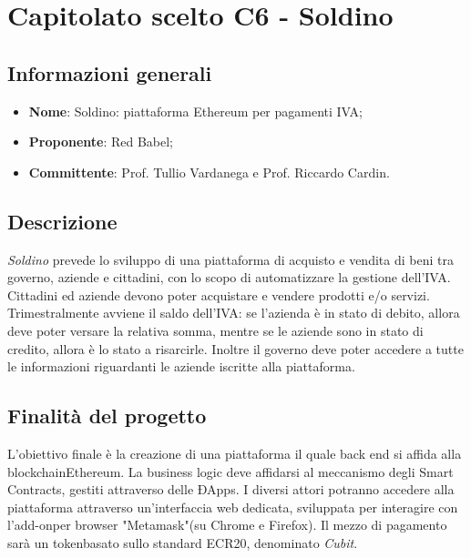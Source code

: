 \section{Capitolato scelto C6 - Soldino}
\subsection{Informazioni generali}
% 
\begin{itemize}
\item \textbf{Nome}: Soldino: piattaforma Ethereum per pagamenti IVA;
\item \textbf{Proponente}: Red Babel;
\item \textbf{Committente}: Prof. Tullio Vardanega e Prof. Riccardo Cardin.
\end{itemize}

\subsection{Descrizione}
\textit{Soldino} prevede lo sviluppo di una piattaforma di acquisto e vendita di beni tra governo, aziende e cittadini, con lo scopo di automatizzare la gestione dell'IVA. Cittadini ed aziende devono poter acquistare e vendere prodotti e/o servizi. Trimestralmente avviene il saldo dell'IVA: se l'azienda è in stato di debito, allora deve poter versare la relativa somma, mentre se le aziende sono in stato di credito, allora è lo stato a risarcirle. Inoltre il governo deve poter accedere a tutte le informazioni riguardanti le aziende iscritte alla piattaforma.

\subsection{Finalità del progetto}
L’obiettivo finale è la creazione di una piattaforma il quale back end si affida alla blockchain\glosp Ethereum\glo. La business logic deve affidarsi al meccanismo degli Smart Contracts\glo, gestiti attraverso delle ÐApps\glo. I diversi
attori potranno accedere alla piattaforma attraverso un’interfaccia web dedicata, sviluppata per interagire con l'add-on\glosp per browser "Metamask"\glosp (su Chrome e Firefox). Il mezzo di pagamento sarà un token\glosp basato sullo standard ECR20\glo, denominato \textit{Cubit}\glo.



